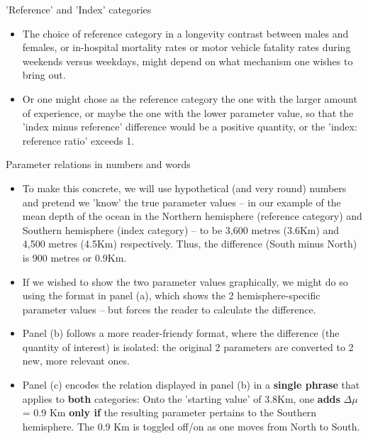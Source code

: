 \documentclass[10pt,handout]{beamer}\usepackage[]{graphicx}\usepackage[]{color}
\begin{document}
\begin{frame}{'Reference' and 'Index' categories}
	\begin{itemize}
		\item The choice of reference category in a longevity contrast between males and females, or in-hospital mortality rates or motor vehicle fatality rates during weekends versus weekdays, might depend on what mechanism one wishes to bring out. 
		
		\item Or one might chose as the reference category the one with the larger amount of experience, or maybe the one with the lower parameter value, so that the 'index minus reference' difference would be a positive quantity, or the 'index: reference ratio' exceeds 1.
	\end{itemize}
\end{frame}



\begin{frame}{Parameter relations in numbers and words}
\begin{itemize}
\item To make this concrete, we will use hypothetical (and very round) numbers and pretend we 'know' the true parameter values -- in our example
of the mean depth of the ocean in the Northern hemisphere (reference category) and Southern hemisphere (index category) -- to be 3,600 metres (3.6Km) and 4,500 metres (4.5Km) respectively. Thus, the difference (South minus North) is 900 metres or 0.9Km.
\pause
\item If we wished to show the two parameter values graphically, we might do so using the format in panel (a), which shows the 2 hemisphere-specific parameter values -- but forces the reader to calculate the difference.

\item Panel (b) follows a more reader-friendy format, where the difference (the quantity of interest) is isolated:  the original 2 parameters are converted to 2 new, more relevant ones. 

\item Panel (c) encodes the relation displayed in panel (b) in a \textbf{single phrase} that applies to \textbf{both} categories: Onto the 'starting value' of 3.8Km, one \textbf{adds} $\Delta \mu$ = 0.9 Km \textbf{only if} the  resulting parameter pertains to the Southern hemisphere. The 0.9 Km is toggled off/on as one moves from North to South.   
\end{itemize}
\end{frame}
\end{document}
